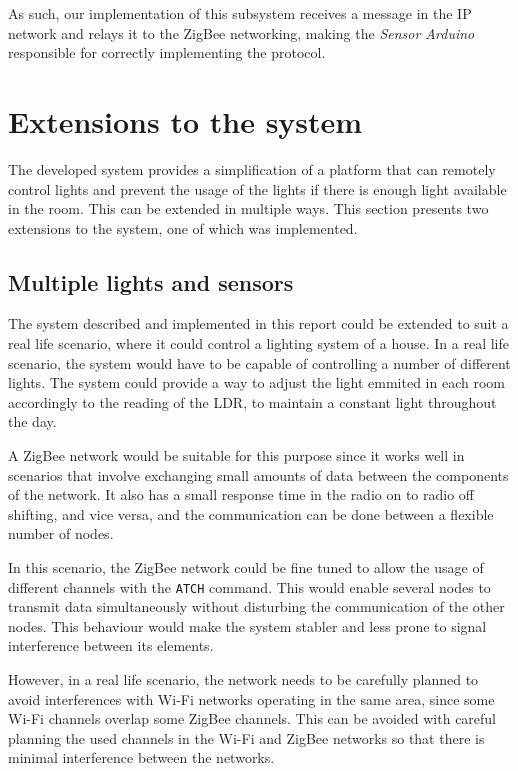 \documentclass[conference, a4paper]{IEEEtran}
\begin{document}
As such, our implementation of this subsystem receives a message in the IP network and relays it to the ZigBee networking, making the \textit{Sensor Arduino} responsible for correctly implementing the protocol.

\section{Extensions to the system}
\label{sys_exts}

The developed system provides a simplification of a platform that can remotely control lights and prevent the usage of the lights if there is enough light available in the room. This can be extended in multiple ways. This section presents two extensions to the system, one of which was implemented.

\subsection{Multiple lights and sensors}

The system described and implemented in this report could be extended to suit a real life scenario, where it could control a lighting system of a house. In a real life scenario, the system would have to be capable of controlling a number of different lights. The system could provide a way to adjust the light emmited in each room accordingly to the reading of the LDR, to maintain a constant light throughout the day.

A ZigBee network would be suitable for this purpose since it works well in scenarios that involve exchanging small amounts of data between the components of the network. It also has a small response time in the radio on to radio off shifting, and vice versa, and the communication can be done between a flexible number of nodes.

In this scenario, the ZigBee network could be fine tuned to allow the usage of different channels with the \texttt{ATCH} command. This would enable several nodes to transmit data simultaneously without disturbing the communication of the other nodes. This behaviour would make the system stabler and less prone to signal interference between its elements.

However, in a real life scenario, the network needs to be carefully planned to avoid interferences with Wi-Fi networks operating in the same area, since some Wi-Fi channels overlap some ZigBee channels. This can be avoided with careful planning the used channels in the Wi-Fi and ZigBee networks so that there is minimal interference between the networks.
\end{document}
